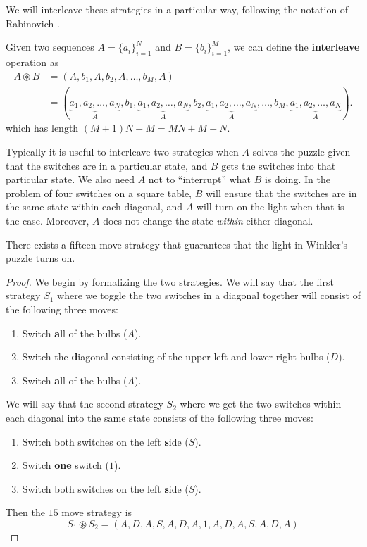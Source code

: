We will interleave these strategies in a particular way, following the notation
of Rabinovich \cite{Rabinovich2022}.

\begin{definition}
  Given two sequences $A = \{a_i\}_{i=1}^N$ and $B = \{b_i\}_{i=1}^M$, we can
  define the \textbf{interleave} operation as \begin{align}
    A \circledast B &= (A,b_1,A,b_2,A,\dots,b_M,A) \\
      &= (
      \underbrace{a_1, a_2, \dots, a_N}_A,
      b_1,
      \underbrace{a_1, a_2, \dots, a_N}_A,
      b_2,
      \underbrace{a_1, a_2, \dots, a_N}_A,
      \dots,
      b_M,
      \underbrace{a_1, a_2, \dots, a_N}_A).
  \end{align} which has length $(M+1)N + M = MN + M + N$.
\end{definition}

Typically it is useful to interleave two strategies when
$A$ solves the puzzle given that the switches are in a particular state, and
$B$ gets the switches into that particular state.
We also need $A$ not to ``interrupt'' what $B$ is doing.
In the problem of four switches on a square table,
$B$ will ensure that the switches are in the same state within each diagonal,
and $A$ will turn on the light when that is the case.
Moreover, $A$ does not change the state \textit{within} either diagonal.

\begin{proposition}
  There exists a fifteen-move strategy that guarantees that the light in
  Winkler's puzzle turns on.
  \label{prop:WinklersSolution}
\end{proposition}
\begin{proof}
  We begin by formalizing the two strategies. We will say that the first
  strategy $S_1$ where we toggle the two switches in a diagonal together
  will consist of the following three moves: \begin{enumerate}
    \item Switch \textbf{a}ll of the bulbs ($A$).
    \item Switch the \textbf{d}iagonal consisting of the upper-left and lower-right bulbs ($D$).
    \item Switch \textbf{a}ll of the bulbs ($A$).
  \end{enumerate}
  We will say that the second strategy $S_2$ where we get the two switches
  within each diagonal into the same state consists of the following three
  moves: \begin{enumerate}
    \item Switch both switches on the left \textbf{s}ide ($S$).
    \item Switch \textbf{one} switch ($1$).
    \item Switch both switches on the left \textbf{s}ide ($S$).
  \end{enumerate}
  Then the $15$ move strategy is \begin{equation}
    S_1 \circledast S_2 = (A, D, A, S, A, D, A, 1, A, D, A, S, A, D, A)
  \end{equation}
\end{proof}

